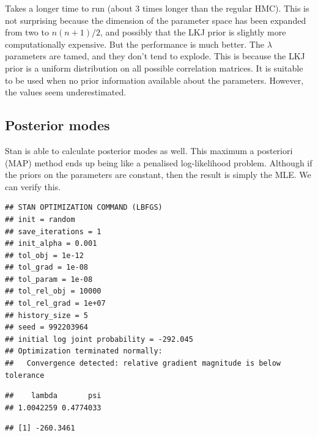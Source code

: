 \documentclass[english, 11pt]{article}
\begin{document}
Takes a longer time to run (about 3 times longer than the regular HMC). This is not surprising because the dimension of the parameter space has been expanded from two to $n(n+1)/2$, and possibly that the LKJ prior is slightly more computationally expensive. But the performance is much better. The $\lambda$ parameters are tamed, and they don't tend to explode. This is because the LKJ prior is a uniform distribution on all possible correlation matrices. It is suitable to be used when no prior information available about the parameters. However, the values seem underestimated.

\subsection{Posterior modes}

Stan is able to calculate posterior modes as well. This maximum a posteriori (MAP) method ends up being like a penalised log-likelihood problem. Although if the priors on the parameters are constant, then the result is simply the MLE. We can verify this.



\begin{knitrout}
\color{fgcolor}\begin{kframe}
\begin{alltt}
 \hlkwb{<-}     \hlstd{=} \hlstd{)}
\end{alltt}
\begin{verbatim}
## STAN OPTIMIZATION COMMAND (LBFGS)
## init = random
## save_iterations = 1
## init_alpha = 0.001
## tol_obj = 1e-12
## tol_grad = 1e-08
## tol_param = 1e-08
## tol_rel_obj = 10000
## tol_rel_grad = 1e+07
## history_size = 5
## seed = 992203964
## initial log joint probability = -292.045
## Optimization terminated normally: 
##   Convergence detected: relative gradient magnitude is below tolerance
\end{verbatim}
\begin{alltt}
\hlopt{$}\hlstd{par[}\hlopt{$} \hlopt{==} \hlstd{(}\hlstd{,} \hlstd{)]}
\end{alltt}
\begin{verbatim}
##    lambda       psi 
## 1.0042259 0.4774033
\end{verbatim}
\begin{alltt}
\hlopt{$}
\end{alltt}
\begin{verbatim}
## [1] -260.3461
\end{verbatim}
\end{kframe}
\end{knitrout}
\end{document}

